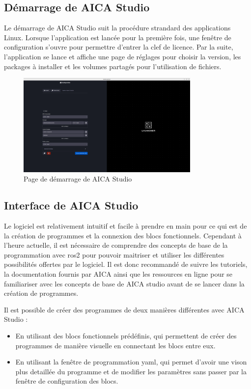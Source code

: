 \subsection{Démarrage de AICA Studio}
Le démarrage de AICA Studio suit la procédure strandard des applications Linux. Lorsque l'application est lancée pour la première fois, une fenêtre de configuration s'ouvre pour permettre d'entrer la clef de licence. Par la suite, l'application se lance et affiche une page de réglages pour choisir la version, les packages à installer et les volumes partagés pour l'utilisation de fichiers.

\begin{figure}[H]
    \centering
    \includegraphics[width=0.8\textwidth]{assets/figures/AICA_Mainmenu.png}
    \caption{Page de démarrage de AICA Studio}
    \label{fig:aica_startup}
\end{figure}

\subsection{Interface de AICA Studio}
Le logiciel est relativement intuitif et facile à prendre en main pour ce qui est de la création de programmes et la connexion des blocs fonctionnels. Cependant à l'heure actuelle, il est nécessaire de comprendre des concepts de base de la programmation avec \gls{ros2} pour pouvoir maitriser et utiliser les différentes possibilités offertes par le logiciel. Il est donc recommandé de suivre les tutoriels, la documentation fournis par AICA ainsi que les ressources en ligne pour se familiariser avec les concepts de base de AICA studio avant de se lancer dans la création de programmes.

Il est possible de créer des programmes de deux manières différentes avec AICA Studio :
\begin{itemize}
    \item En utilisant des blocs fonctionnels prédéfinis, qui permettent de créer des programmes de manière visuelle en connectant les blocs entre eux.
    \item En utilisant la fenêtre de programmation \gls{yaml}, qui permet d'avoir une vison plus detaillée du programme et de modifier les paramètres sans passer par la fenêtre de configuration des blocs.
\end{itemize}

